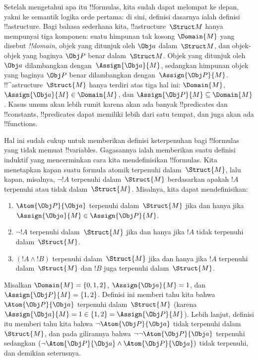 \documentclass[../../../include/open-logic-section]{subfiles}
\begin{document}


Setelah mengetahui apa itu !!{formula}s, kita sudah dapat melompat ke depan,
yakni ke semantik logika orde pertama: di sini, definisi dasarnya ialah
definisi !!a{structure}. Bagi bahasa sederhana kita, !!a{structure}~$\Struct
M$ hanya mempunyai tiga komponen: suatu himpunan tak kosong $\Domain{M}$ yang
disebut \emph{!!{domain}}, objek yang ditunjuk oleh $\Obj a$ dalam~$\Struct
M$, dan objek-objek yang baginya $\Obj P$ benar dalam~$\Struct M$. Objek yang
ditunjuk oleh~$\Obj a$ dilambangkan dengan~$\Assign{\Obj a}{M}$, sedangkan
himpunan objek yang baginya $\Obj P$ benar dilambangkan dengan~$\Assign{\Obj
P}{M}$. !!^a{structure}~$\Struct{M}$ hanya terdiri atas tiga hal ini:
$\Domain{M}$, $\Assign{\Obj a}{M} \in \Domain{M}$, dan $\Assign{\Obj P}{M}
\subseteq \Domain{M}$. Kasus umum akan lebih rumit karena akan ada banyak
!!{predicate}s dan !!{constant}s, !!{predicate}s dapat memiliki lebih dari
satu tempat, dan juga akan ada !!{function}s.

Hal ini sudah cukup untuk memberikan definisi keterpenuhan bagi !!{formula}s
yang tidak memuat !!{variable}s. Gagasannya ialah memberikan suatu definisi
induktif yang mencerminkan cara kita mendefinisikan !!{formula}s. Kita
menetapkan kapan suatu formula atomik terpenuhi dalam~$\Struct{M}$, lalu
kapan, misalnya, $\lnot !A$ terpenuhi dalam~$\Struct{M}$ berdasarkan apakah
$!A$ terpenuhi atau tidak dalam~$\Struct{M}$. Misalnya, kita dapat
mendefinisikan:
\begin{enumerate}
  \item $\Atom{\Obj P}{\Obj a}$ terpenuhi dalam~$\Struct{M}$ jika dan hanya
  jika $\Assign{\Obj a}{M} \in \Assign{\Obj P}{M}$.
  \item $\lnot !A$ terpenuhi dalam~$\Struct{M}$ jika dan hanya jika $!A$
  tidak terpenuhi dalam~$\Struct{M}$.
  \item $(!A \land !B)$ terpenuhi dalam~$\Struct{M}$ jika dan hanya jika
  $!A$ terpenuhi dalam~$\Struct{M}$ dan $!B$ juga terpenuhi
  dalam~$\Struct{M}$.
\end{enumerate}
Misalkan $\Domain{M} = \{0, 1, 2\}$, $\Assign{\Obj a}{M} = 1$, dan
$\Assign{\Obj P}{M} = \{1, 2\}$. Definisi ini memberi tahu kita bahwa
$\Atom{\Obj P}{\Obj a}$ terpenuhi dalam~$\Struct{M}$ (karena $\Assign{\Obj
a}{M} = 1 \in \{1,2\} = \Assign{\Obj P}{M}$). Lebih lanjut, definisi itu
memberi tahu kita bahwa $\lnot \Atom{\Obj P}{\Obj a}$ tidak terpenuhi
dalam~$\Struct{M}$, dan pada gilirannya bahwa $\lnot\lnot \Atom{\Obj P}{\Obj
a}$ terpenuhi sedangkan $(\lnot \Atom{\Obj P}{\Obj a} \land \Atom{\Obj
P}{\Obj a})$ tidak terpenuhi, dan demikian seterusnya.
\end{document}

